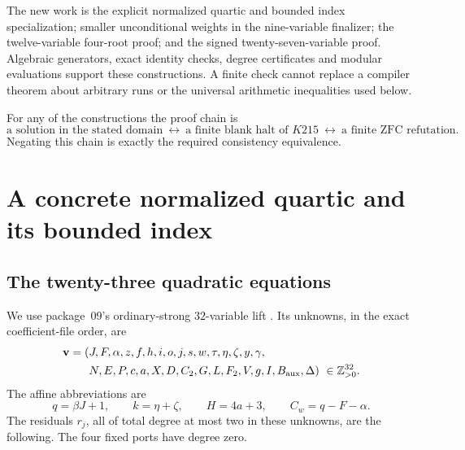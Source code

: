 \documentclass[11pt,a4paper]{article}
\theoremstyle{remark}
\newcommand{\ZZ}{\mathbb Z}
\begin{document}
The new work is the explicit normalized quartic and bounded index
specialization; smaller unconditional weights in the nine-variable
finalizer; the twelve-variable four-root proof; and the signed
twenty-seven-variable proof.  Algebraic generators, exact identity
checks, degree certificates and modular evaluations support these
constructions.  A finite check cannot replace a compiler theorem about
arbitrary runs or the universal arithmetic inequalities used below.

For any of the constructions the proof chain is
\[
 \text{a solution in the stated domain}
 \ \longleftrightarrow\
 \text{a finite blank halt of }K215
 \ \longleftrightarrow\
 \text{a finite ZFC refutation}.
\]
Negating this chain is exactly the required consistency equivalence.

\section{A concrete normalized quartic and its bounded index}
\label{sec:quartic}

\subsection{The twenty-three quadratic equations}

We use package~09's ordinary-strong $32$-variable lift
\cite{quartic32}.  Its unknowns, in the exact coefficient-file order, are
\begin{align*}
\mathbf v=(
&J,F,\alpha,z,f,h,i,o,j,s,w,\tau,\eta,\zeta,y,\gamma,\\
&N,E,P,c,a,X,D,C_2,G,L,F_2,V,g,I,B_{\rm aux},\Delta)
\ \in\ZZ_{>0}^{32}.
\end{align*}
The affine abbreviations are
\[
 q=\beta J+1,\qquad k=\eta+\zeta,\qquad H=4a+3,
 \qquad C_w=q-F-\alpha.
\]
The residuals $r_j$, all of total degree at most two in these unknowns,
are the following.  The four fixed ports have degree zero.
\end{document}
